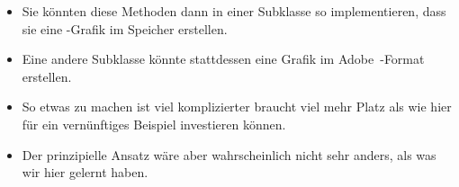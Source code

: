 \documentclass[aspectratio=169,mathserif,notheorems]{beamer}%
\begin{document}
\begin{frame}[t]
\begin{itemize}
%
\item<15-> Sie könnten diese Methoden dann in einer Subklasse so implementieren, dass sie eine -Grafik im Speicher erstellen.%
%
\item<16-> Eine andere Subklasse könnte stattdessen eine Grafik im Adobe~-Format erstellen.%
%
\item<17-> So etwas zu machen ist viel komplizierter braucht viel mehr Platz als wie hier für ein vernünftiges Beispiel investieren können.%
%
\item<18-> Der prinzipielle Ansatz wäre aber wahrscheinlich nicht sehr anders, als was wir hier gelernt haben.%
\end{itemize}%
\end{frame}%
%
\endPresentation%
\end{document}
